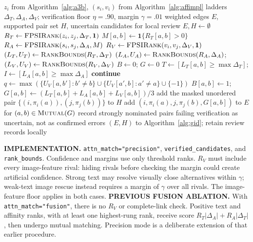 \documentclass[11pt]{article}
\newcommand{\mutual}{\textsc{Mutual}}
\newcommand{\fprank}{\textsc{FPSIRank}}
\newcommand{\bounds}{\textsc{RankBounds}}
\newcommand{\ind}{\mathbf{1}}
\begin{document}
\begin{algorithm}[p]
\caption{Precision-first attention--affinity preprocessing: current \texttt{psi\_attn\_filter}}
\label{alg:precision}
\footnotesize\begin{algorithmic}[1]
\Require $z_i$ from Algorithm~\ref{alg:a3b}, $(s_i,v_i)$ from Algorithm~\ref{alg:affimpl}
\Require ladders $\Delta_T,\Delta_A,\Delta_V$; verification floor $\eta=.90$, margin $\gamma=.01$
\Ensure weighted edges $E$, supported pair set $H$, uncertain candidates for local review
\State $E,H\gets\emptyset$
 \State $R_T\gets\fprank(z_i,z_j,\Delta_T,\mathbf{1})$
 \State $M[a,b]\gets\ind\{R_T[a,b]>0\}$
 \State $R_A\gets\fprank(s_i,s_j,\Delta_A,M)$ 
 \State $R_V\gets\fprank(v_i,v_j,\Delta_V,\mathbf{1})$ 
 \State $(L_T,U_T)\gets\bounds(R_T,\Delta_T)$
 \State $(L_A,U_A)\gets\bounds(R_A,\Delta_A)$; $(L_V,U_V)\gets\bounds(R_V,\Delta_V)$
 \State $B\gets0$; $G\gets0$
  \State $T\gets[L_T[a,b]\ge\max\Delta_T]$; $I\gets[L_A[a,b]\ge\max\Delta_A]$
   \State \textbf{continue}
  \EndIf
  \State $q\gets\max(\{U_V[a,b']:b'\ne b\}\cup\{U_V[a',b]:a'\ne a\}\cup\{-1\})$
   \State $B[a,b]\gets1$; $G[a,b]\gets(L_T[a,b]+L_A[a,b]+L_V[a,b])/3$
   \State add the masked unordered pair $\{(i,\pi_i(a)),(j,\pi_j(b))\}$ to $H$
  \EndIf
 \EndFor
 \State add $(i,\pi_i(a),j,\pi_j(b),G[a,b])$ to $E$ for $(a,b)\in\mutual(G)$
 \State record strongly nominated pairs failing verification as uncertain, not as confirmed errors
\EndFor
\State \Return $(E,H)$ to Algorithm~\ref{alg:gid}; retain review records locally
\Statex \hrulefill
\Statex \raggedright\textbf{IMPLEMENTATION.} \texttt{attn\_match="precision"},
\texttt{verified\_candidates}, and \texttt{rank\_bounds}. Confidence and margins
use only threshold ranks. $R_V$ must include every image-feature rival: hiding
rivals before checking the margin could create artificial confidence.
Strong text may resolve visually close alternatives within $\gamma$;
weak-text image rescue instead requires a margin of $\gamma$ over all rivals.
The image-feature floor applies in both cases.
\Statex
\Statex \textbf{PREVIOUS FUSION ABLATION.} With \texttt{attn\_match="fusion"},
there is no $R_V$ or complete-link check. Positive text and affinity ranks, with
at least one highest-rung rank, receive score
$R_T|\Delta_A|+R_A|\Delta_T|$, then undergo mutual matching.
Precision mode is a deliberate extension of that earlier procedure.
\end{algorithmic}\end{algorithm}
\end{document}
